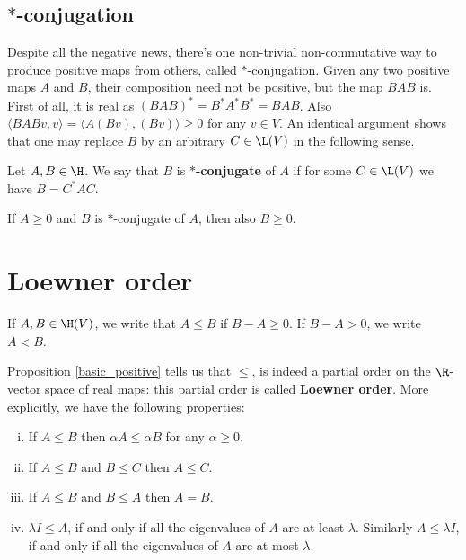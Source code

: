 \subsection{$*$-conjugation}

Despite all the negative news, there's one non-trivial non-commutative way to produce positive maps from others, called $*$-conjugation. Given any two positive maps $A$ and $B$, their composition need not be positive, but the map $BAB$ is. First of all, it is real as $(BAB)^{*} = B^{*} A^{*} B^{*} = BAB$. Also $\langle BAB v, v \rangle = \langle A (B v), (B v) \rangle \geq 0$ for any $v \in V$. An identical argument shows that one may replace $B$ by an arbitrary $C \in \L(V)$ in the following sense.

\begin{maar}
	Let $A, B \in \H$. We say that $B$ is \textbf{$*$-conjugate} of $A$ if for some $C \in \L(V)$ we have $B = C^{*} A C$.
\end{maar}

\begin{prop}
	If $A \geq 0$ and $B$ is $*$-conjugate of $A$, then also $B \geq 0$.
\end{prop}

\section{Loewner order}

\begin{maar}
	If $A, B \in \H(V)$, we write that $A \leq B$ if $B - A \geq 0$. If $B - A > 0$, we write $A < B$.
\end{maar}

Proposition \ref{basic_positive} tells us that $\leq$, is indeed a partial order on the $\R$-vector space of real maps: this partial order is called \textbf{Loewner order}. More explicitly, we have the following properties:

\begin{prop}\label{basic_loewner}
	\begin{enumerate}[(i)]
		\item If $A \leq B$ then $\alpha A \leq \alpha B$ for any $\alpha \geq 0$.
		\item If $A \leq B$ and $B \leq C$ then $A \leq C$.
		\item If $A \leq B$ and $B \leq A$ then $A = B$.
		\item $\lambda I \leq A$, if and only if all the eigenvalues of $A$ are at least $\lambda$. Similarly $A \leq \lambda I$, if and only if all the eigenvalues of $A$ are at most $\lambda$.
	\end{enumerate}
\end{prop}

